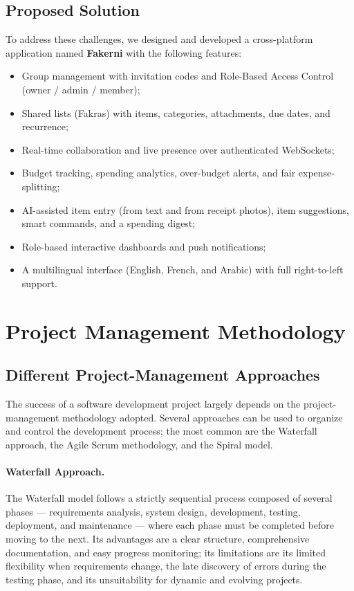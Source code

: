 \documentclass[12pt,a4paper,oneside]{report}
\begin{document}
\subsection{Proposed Solution}
To address these challenges, we designed and developed a cross-platform
application named \textbf{Fakerni} with the following features:
\begin{itemize}[nosep]
  \item Group management with invitation codes and Role-Based Access Control
        (owner / admin / member);
  \item Shared lists (Fakras) with items, categories, attachments, due dates, and
        recurrence;
  \item Real-time collaboration and live presence over authenticated WebSockets;
  \item Budget tracking, spending analytics, over-budget alerts, and fair
        expense-splitting;
  \item AI-assisted item entry (from text and from receipt photos), item
        suggestions, smart commands, and a spending digest;
  \item Role-based interactive dashboards and push notifications;
  \item A multilingual interface (English, French, and Arabic) with full
        right-to-left support.
\end{itemize}

\section{Project Management Methodology}
\subsection{Different Project-Management Approaches}
The success of a software development project largely depends on the
project-management methodology adopted. Several approaches can be used to organize
and control the development process; the most common are the Waterfall approach,
the Agile Scrum methodology, and the Spiral model.

\paragraph{Waterfall Approach.}
The Waterfall model follows a strictly sequential process composed of several
phases --- requirements analysis, system design, development, testing,
deployment, and maintenance --- where each phase must be completed before moving
to the next. Its advantages are a clear structure, comprehensive documentation,
and easy progress monitoring; its limitations are its limited flexibility when
requirements change, the late discovery of errors during the testing phase, and
its unsuitability for dynamic and evolving projects.
\end{document}
